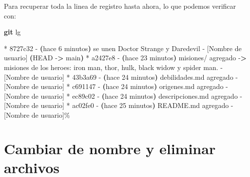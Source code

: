 \documentclass[
]{book}
\newenvironment{Shaded}{\begin{snugshade}}{\end{snugshade}}
\newcommand{\AttributeTok}[1]{\textcolor[rgb]{0.13,0.29,0.53}{#1}}
\newcommand{\ErrorTok}[1]{\textcolor[rgb]{0.64,0.00,0.00}{\textbf{#1}}}
\newcommand{\ExtensionTok}[1]{#1}
\newcommand{\FunctionTok}[1]{\textcolor[rgb]{0.13,0.29,0.53}{\textbf{#1}}}
\newcommand{\KeywordTok}[1]{\textcolor[rgb]{0.13,0.29,0.53}{\textbf{#1}}}
\newcommand{\NormalTok}[1]{#1}
\newcommand{\OperatorTok}[1]{\textcolor[rgb]{0.81,0.36,0.00}{\textbf{#1}}}
\begin{document}
Para recuperar toda la linea de registro hasta ahora, lo que podemos verificar con:

\begin{Shaded}
\begin{Highlighting}[]
\FunctionTok{git}\NormalTok{ lg}
\end{Highlighting}
\end{Shaded}

\begin{Shaded}
\begin{Highlighting}[]
\ExtensionTok{*}\NormalTok{ 8727c32 }\AttributeTok{{-}} \ErrorTok{(}\ExtensionTok{hace}\NormalTok{ 6 minutos}\KeywordTok{)} \ExtensionTok{se}\NormalTok{ unen Doctor Strange y Daredevil }\AttributeTok{{-}}\NormalTok{ [Nombre de usuario] }\ErrorTok{(}\ExtensionTok{HEAD} \AttributeTok{{-}}\OperatorTok{\textgreater{}}\NormalTok{ main}\KeywordTok{)}
\ExtensionTok{*}\NormalTok{ a2427e8 }\AttributeTok{{-}} \ErrorTok{(}\ExtensionTok{hace}\NormalTok{ 23 minutos}\KeywordTok{)} \ExtensionTok{misiones/}\NormalTok{ agregado }\AttributeTok{{-}}\OperatorTok{\textgreater{}}\NormalTok{ misiones de los heroes: iron man, thor, hulk, black widow y spider man. }\AttributeTok{{-}}\NormalTok{ [Nombre de usuario]}
\ExtensionTok{*}\NormalTok{ 43b3a69 }\AttributeTok{{-}} \ErrorTok{(}\ExtensionTok{hace}\NormalTok{ 24 minutos}\KeywordTok{)} \ExtensionTok{debilidades.md}\NormalTok{ agregado }\AttributeTok{{-}}\NormalTok{ [Nombre de usuario]}
\ExtensionTok{*}\NormalTok{ c691147 }\AttributeTok{{-}} \ErrorTok{(}\ExtensionTok{hace}\NormalTok{ 24 minutos}\KeywordTok{)} \ExtensionTok{origenes.md}\NormalTok{ agregado }\AttributeTok{{-}}\NormalTok{ [Nombre de usuario]}
\ExtensionTok{*}\NormalTok{ ec89c02 }\AttributeTok{{-}} \ErrorTok{(}\ExtensionTok{hace}\NormalTok{ 24 minutos}\KeywordTok{)} \ExtensionTok{descripciones.md}\NormalTok{ agregado }\AttributeTok{{-}}\NormalTok{ [Nombre de usuario]}
\ExtensionTok{*}\NormalTok{ ac02fe0 }\AttributeTok{{-}} \ErrorTok{(}\ExtensionTok{hace}\NormalTok{ 25 minutos}\KeywordTok{)} \ExtensionTok{README.md}\NormalTok{ agregado }\AttributeTok{{-}}\NormalTok{ [Nombre de usuario]\%     }
\end{Highlighting}
\end{Shaded}

\section{Cambiar de nombre y eliminar archivos}\label{cambiar-de-nombre-y-eliminar-archivos}
\end{document}
